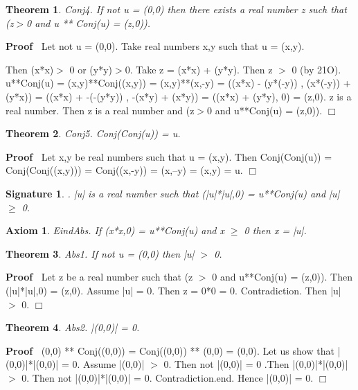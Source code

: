 \documentclass{article}
\newenvironment{forthel}{\begin{leftbar}}{\end{leftbar}}
\newenvironment{proof}{\noindent\textbf{Proof\ }}{\hspace*{\fill}$\Box$\medskip}
\newtheorem{axiom}{Axiom}
\newtheorem{theorem}{Theorem}
\newtheorem{signature}{Signature}
\begin{document}
\begin{forthel}
\begin{theorem}
 Conj4. If not u = (0,0) then there exists a real number z such that (z$>$0 and u ** Conj(u) = (z,0)).
\end{theorem}\begin{proof}
	Let not u = (0,0).
Take real numbers x,y such that u = (x,y).

Then (x*x)$>$ 0 or (y*y)$>$0. Take z = (x*x) + (y*y). 
Then z $>$ 0 (by 21O).
u**Conj(u) = (x,y)**Conj((x,y)) = (x,y)**(x,-y) = ((x*x) - (y*(-y)) , (x*(-y)) + (y*x)) = ((x*x) + -(-(y*y)) , -(x*y) + (x*y)) = ((x*x) + (y*y), 0) = (z,0).
z is a real number.
Then z is a real number and (z$>$0 and u**Conj(u) = (z,0)).
\end{proof}


\begin{theorem}
 Conj5. Conj(Conj(u)) = u.
\end{theorem}\begin{proof}
 	Let x,y be real numbers such that u = (x,y).
Then Conj(Conj(u)) = Conj(Conj((x,y))) = Conj((x,-y)) = (x,--y) = (x,y) = u. \end{proof}



\begin{signature}. |u| is a real number such that (|u|*|u|,0) = u**Conj(u) and |u| $\geq$ 0. 

\end{signature}
\begin{axiom}  EindAbs. If (x*x,0) = u**Conj(u) and x $\geq$ 0 then x = |u|.

\end{axiom}



\begin{theorem}
 Abs1. If not u = (0,0) then |u| $>$ 0.
\end{theorem}\begin{proof}
  Let z be a real number such that (z $>$ 0 and u**Conj(u) = (z,0)). Then (|u|*|u|,0) = (z,0).
Assume |u| = 0. Then z = 0*0 = 0. Contradiction. 
Then |u| $>$ 0.
\end{proof}


\begin{theorem}
 Abs2. |(0,0)| = 0.
\end{theorem}\begin{proof}
 	(0,0) ** Conj((0,0)) = Conj((0,0)) ** (0,0) = (0,0). 
Let us show that |(0,0)|*|(0,0)| = 0.
Assume |(0,0)| $>$ 0. Then not |(0,0)| = 0 .Then |(0,0)|*|(0,0)| $>$ 0. Then not |(0,0)|*|(0,0)| = 0. Contradiction.end. 
Hence |(0,0)| = 0.
\end{proof}



\end{forthel}
\end{document}
